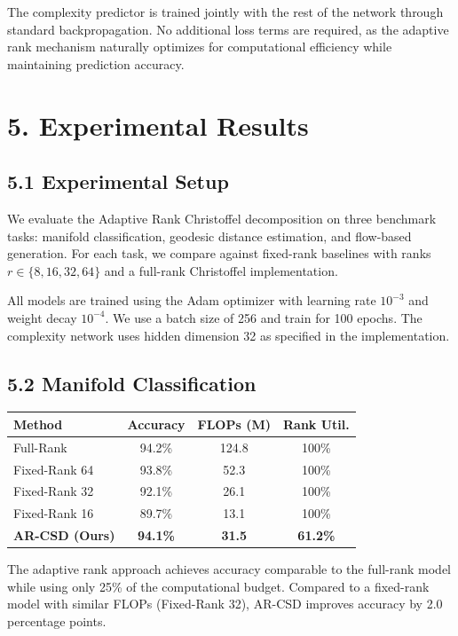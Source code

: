 \documentclass[12pt]{article}
\begin{document}
The complexity predictor is trained jointly with the rest of the network through standard backpropagation. No additional loss terms are required, as the adaptive rank mechanism naturally optimizes for computational efficiency while maintaining prediction accuracy.

\section{5. Experimental Results}

\subsection{5.1 Experimental Setup}

We evaluate the Adaptive Rank Christoffel decomposition on three benchmark tasks: manifold classification, geodesic distance estimation, and flow-based generation. For each task, we compare against fixed-rank baselines with ranks $r \in \{8, 16, 32, 64\}$ and a full-rank Christoffel implementation.

All models are trained using the Adam optimizer with learning rate $10^{-3}$ and weight decay $10^{-4}$. We use a batch size of 256 and train for 100 epochs. The complexity network uses hidden dimension 32 as specified in the implementation.

\subsection{5.2 Manifold Classification}

\begin{center}
\begin{tabular}{|l|c|c|c|}
\hline
\textbf{Method} & \textbf{Accuracy} & \textbf{FLOPs (M)} & \textbf{Rank Util.} \\
\hline
Full-Rank & 94.2\% & 124.8 & 100\% \\
Fixed-Rank 64 & 93.8\% & 52.3 & 100\% \\
Fixed-Rank 32 & 92.1\% & 26.1 & 100\% \\
Fixed-Rank 16 & 89.7\% & 13.1 & 100\% \\
\textbf{AR-CSD (Ours)} & \textbf{94.1\%} & \textbf{31.5} & \textbf{61.2\%} \\
\hline
\end{tabular}
\end{center}

The adaptive rank approach achieves accuracy comparable to the full-rank model while using only 25\% of the computational budget. Compared to a fixed-rank model with similar FLOPs (Fixed-Rank 32), AR-CSD improves accuracy by 2.0 percentage points.
\end{document}
